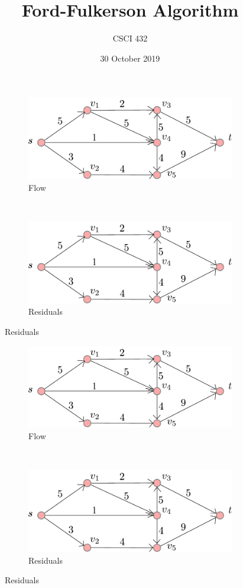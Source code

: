 \documentclass{article}
\title{Ford-Fulkerson Algorithm}
\author{CSCI 432}
\date{30 October 2019}
\begin{document}
\begin{figure}
\centering
\begin{subfigure}[b]{.45\textwidth}
\includegraphics[width=\textwidth]{../figs/graph}\caption*{Flow}
\end{subfigure}
~~
\begin{subfigure}[b]{.45\textwidth}
\includegraphics[width=\textwidth]{../figs/graph}\caption*{Residuals}
\end{subfigure}
\end{figure}

\begin{figure}
\centering
\begin{subfigure}[b]{.45\textwidth}
\includegraphics[width=\textwidth]{../figs/graph}\caption*{Flow}
\end{subfigure}
~~
\begin{subfigure}[b]{.45\textwidth}
\includegraphics[width=\textwidth]{../figs/graph}\caption*{Residuals}
\end{subfigure}
\end{figure}
\end{document}
